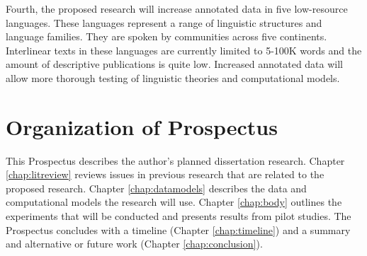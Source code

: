 Fourth, the proposed research will increase annotated data in five low-resource languages. These languages represent a range of linguistic structures and language families. They are spoken by communities across five continents. Interlinear texts in these languages are currently limited to 5-100K words and the amount of descriptive publications is quite low. Increased annotated data will allow more thorough testing of linguistic theories and computational models.

\section{Organization of Prospectus}

This Prospectus describes the author's planned dissertation research. Chapter \ref{chap:litreview} reviews issues in previous research that are related to the proposed research. Chapter \ref{chap:datamodels} describes the data and computational models the research will use. Chapter \ref{chap:body} outlines the experiments that will be conducted and presents results from pilot studies. The Prospectus concludes with a timeline (Chapter \ref{chap:timeline}) and a summary and alternative or future work (Chapter \ref{chap:conclusion}).

